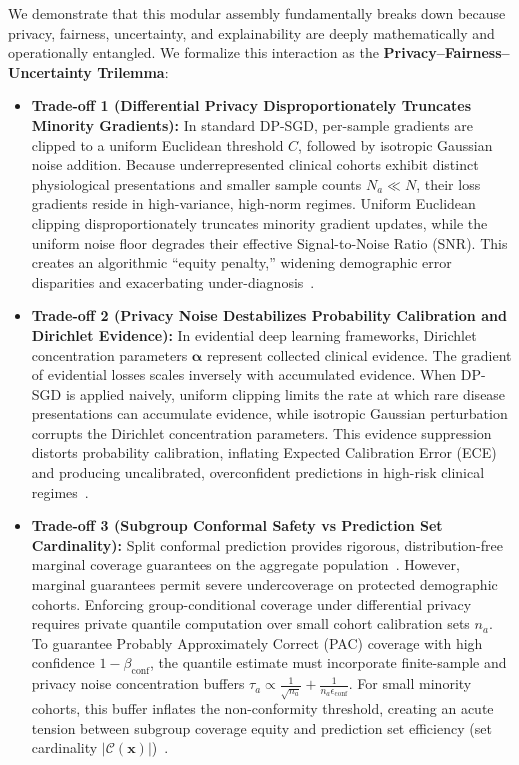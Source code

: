 \documentclass[pdflatex,sn-vancouver-num,referee,lineno]{sn-jnl}
\theoremstyle{thmstyleone}
\theoremstyle{thmstylethree}
\begin{document}
We demonstrate that this modular assembly fundamentally breaks down because privacy, fairness, uncertainty, and explainability are deeply mathematically and operationally entangled. We formalize this interaction as the \textbf{Privacy--Fairness--Uncertainty Trilemma}:
\begin{itemize}
    \item \textbf{Trade-off 1 (Differential Privacy Disproportionately Truncates Minority Gradients):} In standard DP-SGD, per-sample gradients are clipped to a uniform Euclidean threshold $C$, followed by isotropic Gaussian noise addition. Because underrepresented clinical cohorts exhibit distinct physiological presentations and smaller sample counts $N_a \ll N$, their loss gradients reside in high-variance, high-norm regimes. Uniform Euclidean clipping disproportionately truncates minority gradient updates, while the uniform noise floor degrades their effective Signal-to-Noise Ratio (SNR). This creates an algorithmic ``equity penalty,'' widening demographic error disparities and exacerbating under-diagnosis~\cite{bagdasaryan2019differential,suriyakumar2021chasing,xu2021removing,tran2021differentially}.
    \item \textbf{Trade-off 2 (Privacy Noise Destabilizes Probability Calibration and Dirichlet Evidence):} In evidential deep learning frameworks, Dirichlet concentration parameters $\boldsymbol{\alpha}$ represent collected clinical evidence. The gradient of evidential losses scales inversely with accumulated evidence. When DP-SGD is applied naively, uniform clipping limits the rate at which rare disease presentations can accumulate evidence, while isotropic Gaussian perturbation corrupts the Dirichlet concentration parameters. This evidence suppression distorts probability calibration, inflating Expected Calibration Error (ECE) and producing uncalibrated, overconfident predictions in high-risk clinical regimes~\cite{farrand2020neither,sensoy2018evidential}.
    \item \textbf{Trade-off 3 (Subgroup Conformal Safety vs Prediction Set Cardinality):} Split conformal prediction provides rigorous, distribution-free marginal coverage guarantees on the aggregate population~\cite{vovk2005algorithmic,angelopoulos2021gentle,tibshirani2019conformal}. However, marginal guarantees permit severe undercoverage on protected demographic cohorts. Enforcing group-conditional coverage under differential privacy requires private quantile computation over small cohort calibration sets $n_a$. To guarantee Probably Approximately Correct (PAC) coverage with high confidence $1-\beta_{\text{conf}}$, the quantile estimate must incorporate finite-sample and privacy noise concentration buffers $\tau_a \propto \frac{1}{\sqrt{n_a}} + \frac{1}{n_a \epsilon_{\text{conf}}}$. For small minority cohorts, this buffer inflates the non-conformity threshold, creating an acute tension between subgroup coverage equity and prediction set efficiency (set cardinality $|\mathcal{C}(\mathbf{x})|$)~\cite{angelopoulos2021private}.
\end{itemize}
\end{document}
